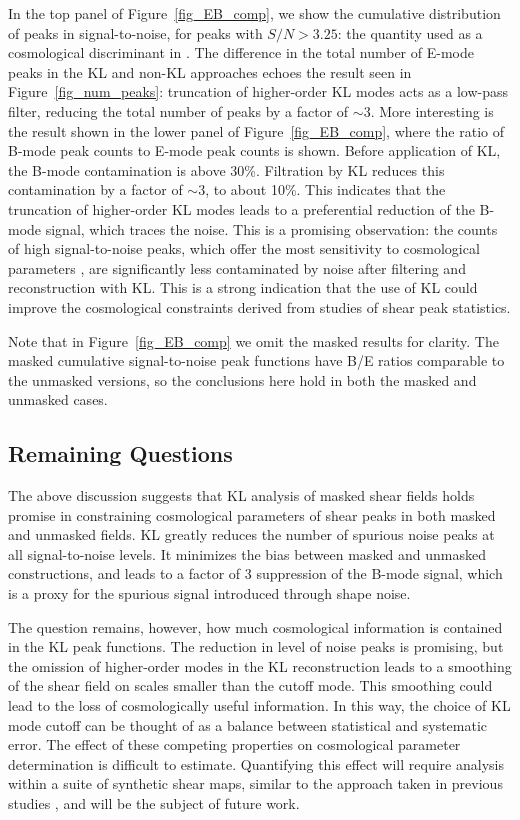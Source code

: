 In the top panel of Figure~\ref{fig_EB_comp}, we show the cumulative 
distribution of peaks in signal-to-noise, for peaks with $S/N > 3.25$:
the quantity used as a cosmological discriminant in \citet{Dietrich10}.
The difference in the total number of E-mode peaks in the KL and non-KL
approaches echoes the result seen
in Figure~\ref{fig_num_peaks}: truncation of higher-order KL modes acts as
a low-pass filter, reducing the total number of peaks by a factor of $\sim 3$.
More interesting is the result shown in the lower panel of 
Figure~\ref{fig_EB_comp}, where the ratio of B-mode peak counts to E-mode 
peak counts is shown.  
Before application of KL, the B-mode contamination is above 
30\%.  Filtration by KL reduces this contamination by a factor of $\sim 3$,
to about 10\%.  This indicates that the truncation of higher-order KL modes
leads to a preferential reduction of the B-mode signal, which traces
the noise.  This is a promising observation: the counts of
high signal-to-noise peaks, 
which offer the most sensitivity to cosmological parameters 
\citep{Dietrich10}, are significantly less contaminated by noise after 
filtering and reconstruction with KL.  This is a strong indication that 
the use of KL could improve the cosmological 
constraints derived from studies of shear peak statistics.

Note that in Figure~\ref{fig_EB_comp} we omit the masked 
results for clarity.  The masked cumulative signal-to-noise peak 
functions have B/E ratios comparable to the unmasked versions, so 
the conclusions here hold in both the masked and unmasked cases.

\subsection{Remaining Questions}
The above discussion suggests that KL analysis of masked shear fields holds
promise in constraining cosmological parameters of shear peaks in both
masked and unmasked fields.  KL greatly
reduces the number of spurious noise peaks at all signal-to-noise levels.
It minimizes the bias between masked and unmasked constructions, and leads
to a factor of 3 suppression of the B-mode signal, which is a proxy
for the spurious signal introduced through shape noise.

The question remains, however, how much cosmological information is contained
in the KL peak functions.  The reduction in level of noise peaks is promising,
but the omission of higher-order modes in the KL reconstruction leads to 
a smoothing of the shear field on scales smaller than the cutoff mode.
This smoothing could lead to the loss of cosmologically useful information.
In this way, the choice of KL mode cutoff can be thought of as a balance 
between statistical and systematic error.
The effect of these competing properties on cosmological
parameter determination is difficult to estimate.  Quantifying this effect
will require analysis within a suite of synthetic shear maps, similar to the
approach taken in previous studies \citep[e.g.][]{Dietrich10,Kratochvil10}, 
and will be the subject of future work.

